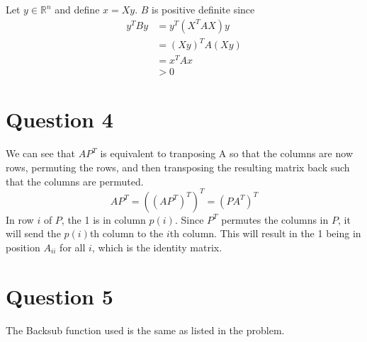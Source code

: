 \documentclass{article}
\begin{document}
Let $y \in \mathbb{R}^n$ and define $x = Xy$.
$B$ is positive definite since
\begin{align*}
    y^TBy &= y^T(X^TAX)y \\
    &= (Xy)^T A (Xy) \\
    &= x^T A x \\
    &> 0
\end{align*}
\newpage 

\section*{Question 4}
We can see that $AP^T$ is equivalent to 
tranposing A so that the columns are now rows,
permuting the rows, and then transposing the resulting matrix 
back such that the columns are permuted.
\[
    AP^T = ((AP^T)^T)^T = (PA^T)^T
\]
In row $i$ of $P$, the 1 is in column $p(i)$.
Since $P^T$ permutes the columns in $P$, it will send the $p(i)$th 
column to the $i$th column.
This will result in the 1 being in position $A_{ii}$ for all $i$,
which is the identity matrix.
\newpage 

\section*{Question 5}
The Backsub function used is the same as listed in the problem.

\end{document}
